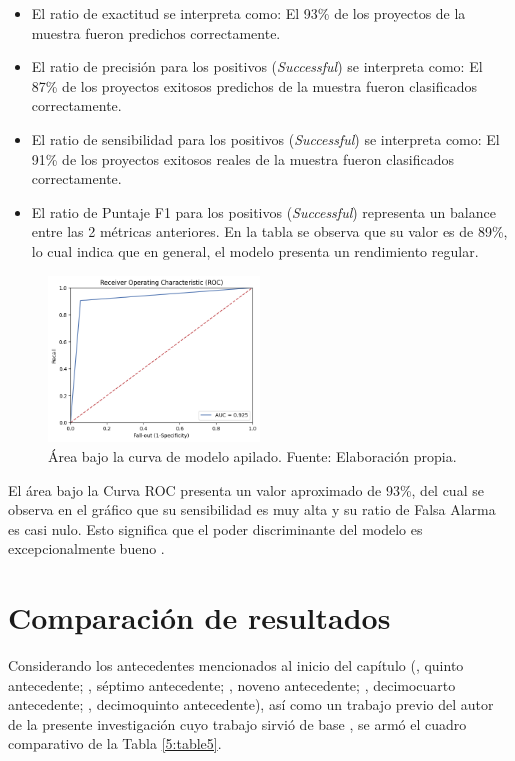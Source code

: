 \begin{itemize}
	\item El ratio de exactitud se interpreta como: El 93\% de los proyectos de la muestra fueron predichos correctamente.
	\item El ratio de precisión para los positivos (\textit{Successful}) se interpreta como: El 87\% de los proyectos exitosos predichos de la muestra fueron clasificados correctamente. 
	\item El ratio de sensibilidad para los positivos (\textit{Successful}) se interpreta como: El 91\% de los proyectos exitosos reales de la muestra fueron clasificados correctamente.
	\item El ratio de Puntaje F1 para los positivos (\textit{Successful}) representa un balance entre las 2 métricas anteriores. En la tabla se observa que su valor es de 89\%, lo cual indica que en general, el modelo presenta un rendimiento regular.
\end{itemize}

\begin{figure}[!ht]
	\begin{center}
		\includegraphics[width=0.50\textwidth]{5/figures/stacked_auc.png}
		\caption{Área bajo la curva de modelo apilado. Fuente: Elaboración propia.}
		\label{5:fig12}
	\end{center}
\end{figure}

El área bajo la Curva ROC presenta un valor aproximado de 93\%, del cual se observa en el gráfico que su sensibilidad es muy alta y su ratio de Falsa Alarma es casi nulo. Esto significa que el poder discriminante del modelo es excepcionalmente bueno \parencite{bk_britos2006datamining}.

\section{Comparación de resultados}
Considerando los antecedentes mencionados al inicio del capítulo (\citeauthor{pr_beckwith2016predcrowd}, quinto antecedente; \citeauthor{pr_yuan2016textanalytics}, séptimo antecedente; \citeauthor{pr_kaur2017socmedcrowd}, noveno antecedente; \citeauthor{pr_cheng2019deeplearning}, decimocuarto antecedente; \citeauthor{pr_chen2019keywords_crowdfunding}, decimoquinto antecedente), así como un trabajo previo del autor de la presente investigación cuyo trabajo sirvió de base \parencite{pr_puente2019kickstarter_prediction}, se armó el cuadro comparativo de la Tabla \ref{5:table5}.


